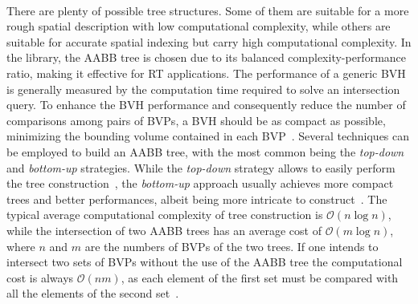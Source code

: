 \paragraph{\AabbTree{}}
There are plenty of possible tree structures. Some of them are suitable for a more rough spatial description with low computational complexity, while others are suitable for accurate spatial indexing but carry high computational complexity. In the \Acme{} library, the \ac{AABB} tree is chosen due to its balanced complexity-performance ratio, making it effective for \ac{RT} applications. The performance of a generic \ac{BVH} is generally measured by the computation time required to solve an intersection query. To enhance the \ac{BVH} performance and consequently reduce the number of comparisons among pairs of \acp{BVP}, a \ac{BVH} should be as compact as possible, minimizing the bounding volume contained in each \ac{BVP}~\cite{asyrani2012bounding, eloe2014dual}. Several techniques can be employed to build an \ac{AABB} tree, with the most common being the \emph{top-down} and \emph{bottom-up} strategies. While the \emph{top-down} strategy allows to easily perform the tree construction~\cite{eloe2014dual, ericson2004realtime, asyrani2012bounding}, the \emph{bottom-up} approach usually achieves more compact trees and better performances, albeit being more intricate to construct~\cite{omohundro1989five, asyrani2012bounding}. The typical average computational complexity of tree construction is $\mathcal{O}(n\log{n})$, while the intersection of two \ac{AABB} trees has an average cost of $\mathcal{O}(m\log{n})$, where $n$ and $m$ are the numbers of \acp{BVP} of the two trees. If one intends to intersect two sets of \acp{BVP} without the use of the \ac{AABB} tree the computational cost is always $\mathcal{O}(nm)$, as each element of the first set must be compared with all the elements of the second set~\cite{xing2010efficient}.


